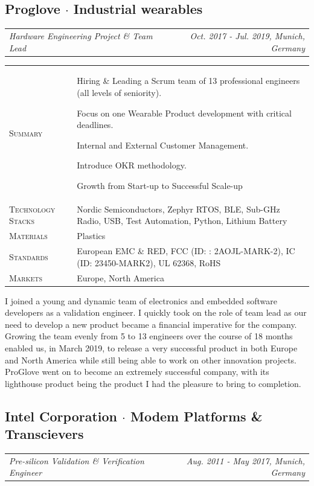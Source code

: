 \documentclass[10pt,a4paper]{moderncv}
\newcommand*{\experienceentry}[5]{
    \subsection{#1 $\cdot$ #2}
    \addvspace{-0.5em}
    {\color{color2}
    \begin{tabularx}{\textwidth}{LR}
        {\itshape #3} & {\itshape #4, #5}
    \end{tabularx}}
    \par\addvspace{1em}
    }
\begin{document}
\experienceentry{Proglove}{Industrial wearables}{Hardware Engineering Project \& Team Lead}{Oct. 2017 - Jul. 2019}{Munich, Germany}

    \begin{tabularx}{\textwidth}{>{\scshape}l@{\hskip 3.5mm}L}
        Summary & Hiring \& Leading a Scrum team of 13 professional engineers (all levels of seniority).
        \par Focus on one Wearable Product development with critical deadlines.
        \par Internal and External Customer Management. 
        \par Introduce OKR methodology.
        \par Growth from Start-up to Successful Scale-up\\
        Technology Stacks & Nordic Semiconductors, Zephyr RTOS, BLE, Sub-GHz Radio, USB, Test Automation, Python, Lithium Battery\\
        Materials & Plastics\\
        Standards & European EMC \& RED, FCC (ID: : 2AOJL-MARK-2), IC (ID: 23450-MARK2), UL 62368, RoHS\\
        Markets & Europe, North America\\
    \end{tabularx}

    \vspace{1.5em}

    I joined a young and dynamic team of electronics and embedded software developers as a validation engineer. I quickly took on the role of team lead as our need to develop a new product became a financial imperative for the company. Growing the team evenly from 5 to 13 engineers over the course of 18 months enabled us, in March 2019, to release a very successful product in both Europe and North America while still being able to work on other innovation projects. ProGlove went on to become an extremely successful company, with its lighthouse product being the product I had the pleasure to bring to completion.

\vspace{0.75em}

\experienceentry{Intel Corporation}{Modem Platforms \& Transcievers}{Pre-silicon Validation \& Verification Engineer}{Aug. 2011 - May 2017}{Munich, Germany}

    \vspace{1.5em}
\end{document}
